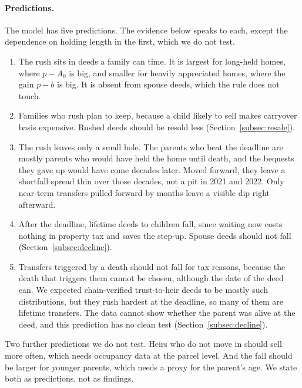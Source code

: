 \paragraph{Predictions.}
The model has five predictions. The evidence below speaks to each, except the dependence on holding length in the first, which we do not test.
\begin{enumerate}
  \item The rush sits in deeds a family can time. It is largest for long-held homes, where $p-A_0$ is big, and smaller for heavily appreciated homes, where the gain $p-b$ is big. It is absent from spouse deeds, which the rule does not touch.
  \item Families who rush plan to keep, because a child likely to sell makes carryover basis expensive. Rushed deeds should be resold less (Section~\ref{subsec:resale}).
  \item The rush leaves only a small hole. The parents who beat the deadline are mostly parents who would have held the home until death, and the bequests they gave up would have come decades later. Moved forward, they leave a shortfall spread thin over those decades, not a pit in 2021 and 2022. Only near-term transfers pulled forward by months leave a visible dip right afterward.
  \item After the deadline, lifetime deeds to children fall, since waiting now costs nothing in property tax and saves the step-up. Spouse deeds should not fall (Section~\ref{subsec:decline}).
  \item Transfers triggered by a death should not fall for tax reasons, because the death that triggers them cannot be chosen, although the date of the deed can. We expected chain-verified trust-to-heir deeds to be mostly such distributions, but they rush hardest at the deadline, so many of them are lifetime transfers. The data cannot show whether the parent was alive at the deed, and this prediction has no clean test (Section~\ref{subsec:decline}).
\end{enumerate}
Two further predictions we do not test. Heirs who do not move in should sell more often, which needs occupancy data at the parcel level. And the fall should be larger for younger parents, which needs a proxy for the parent's age. We state both as predictions, not as findings.

